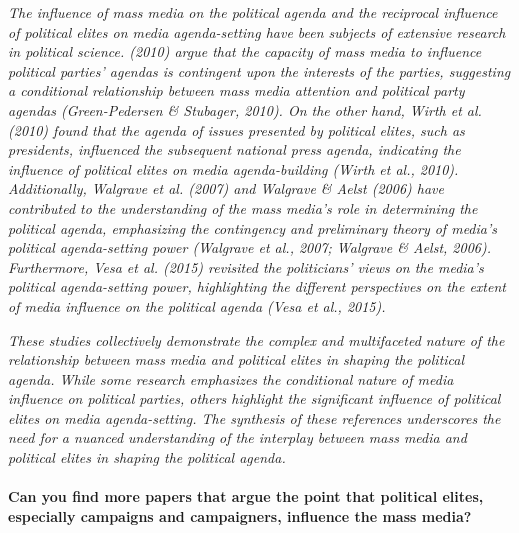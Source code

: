 \documentclass[11pt,a4paper]{article}
\begin{document}
\textit{The influence of mass media on the political agenda and the reciprocal influence of political elites on media agenda-setting have been subjects of extensive research in political science. (2010) argue that the capacity of mass media to influence political parties' agendas is contingent upon the interests of the parties, suggesting a conditional relationship between mass media attention and political party agendas (Green-Pedersen \& Stubager, 2010). On the other hand, Wirth et al. (2010) found that the agenda of issues presented by political elites, such as presidents, influenced the subsequent national press agenda, indicating the influence of political elites on media agenda-building (Wirth et al., 2010). Additionally, Walgrave et al. (2007) and Walgrave \& Aelst (2006) have contributed to the understanding of the mass media's role in determining the political agenda, emphasizing the contingency and preliminary theory of media's political agenda-setting power (Walgrave et al., 2007; Walgrave \& Aelst, 2006). Furthermore, Vesa et al. (2015) revisited the politicians' views on the media's political agenda-setting power, highlighting the different perspectives on the extent of media influence on the political agenda (Vesa et al., 2015).}

 \textit{These studies collectively demonstrate the complex and multifaceted nature of the relationship between mass media and political elites in shaping the political agenda. While some research emphasizes the conditional nature of media influence on political parties, others highlight the significant influence of political elites on media agenda-setting. The synthesis of these references underscores the need for a nuanced understanding of the interplay between mass media and political elites in shaping the political agenda.}
\\
\\
 \textbf{Can you find more papers that argue the point that political elites, especially campaigns and campaigners, influence the mass media?}
\end{document}
